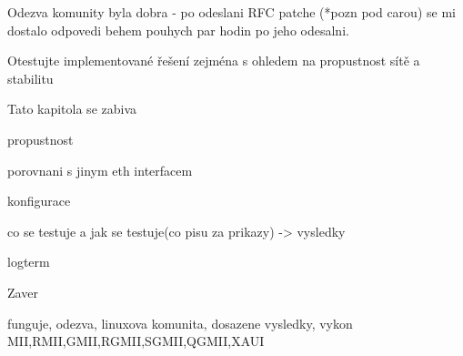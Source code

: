 Odezva komunity byla dobra - po odeslani RFC patche (*pozn pod carou) se mi dostalo odpovedi behem pouhych par hodin po jeho odesalni.

\chap Otestujte implementované řešení zejména s ohledem na propustnost sítě a stabilitu

Tato kapitola se zabiva

\sec propustnost

\sec porovnani s jinym eth interfacem

\sec konfigurace 

co se testuje a jak se testuje(co pisu za prikazy) -> vysledky

\sec logterm

\chap Zaver

funguje, odezva, linuxova komunita, dosazene vysledky, vykon
MII,RMII,GMII,RGMII,SGMII,QGMII,XAUI

